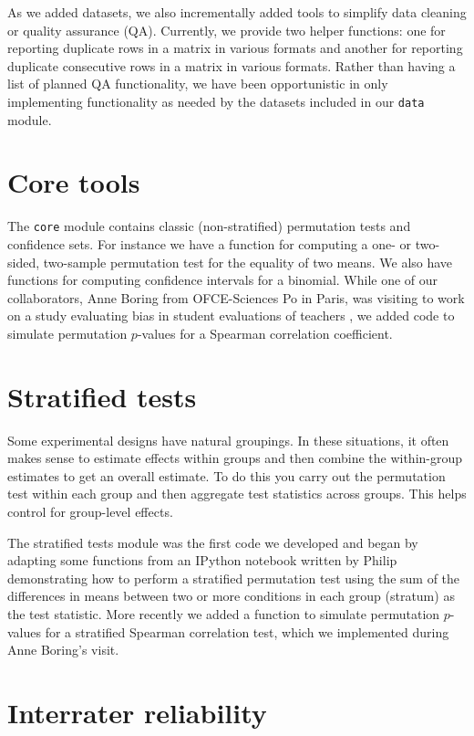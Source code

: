 As we added datasets, we also incrementally added tools to simplify data
cleaning or quality assurance (QA).  Currently, we provide two helper
functions: one for reporting duplicate rows in a matrix in various formats and
another for reporting duplicate consecutive rows in a matrix in various
formats.  Rather than having a list of planned QA functionality, we have been
opportunistic in only implementing functionality as needed by the datasets
included in our \texttt{data} module.

\section{Core tools}

The \texttt{core} module contains classic (non-stratified) permutation tests
and confidence sets.  For instance we have a function for computing a one- or
two-sided, two-sample permutation test for the equality of two means.  We also
have functions for computing confidence intervals for a binomial.
While one of our collaborators, Anne Boring from OFCE-Sciences Po in Paris, was
visiting to work on a study evaluating bias in student evaluations of teachers
\cite{boring2015}, we added code to simulate permutation $p$-values for a Spearman
correlation coefficient.

\section{Stratified tests}

Some experimental designs have natural groupings. In these situations, it often
makes sense to estimate effects within groups and then combine the within-group
estimates to get an overall estimate.  To do this you carry out the permutation
test within each group and then aggregate test statistics across groups. This
helps control for group-level effects.

The stratified tests module was the first code we developed and began by
adapting some functions from an IPython notebook written by Philip
demonstrating how to perform a stratified permutation test using the sum of the
differences in means between two or more conditions in each group (stratum) as
the test statistic.  More recently we added a function to simulate permutation
$p$-values for a stratified Spearman correlation test, which we implemented
during Anne Boring's visit.

\section{\label{sec:irr}Interrater reliability}

